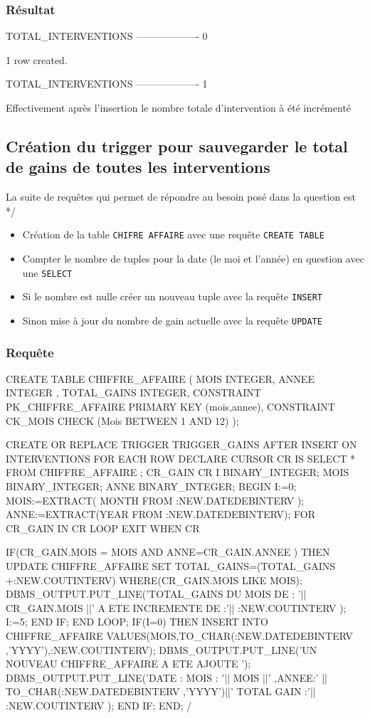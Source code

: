 \documentclass[•]{article}
\begin{document}
\subsubsection{Résultat}
\begin{sql}
TOTAL_INTERVENTIONS
-------------------
                  0

1 row created.

TOTAL_INTERVENTIONS
-------------------
                  1
\end{sql}

Effectivement après l'insertion le nombre totale d'intervention à été incrémenté

\subsection{Création du trigger pour sauvegarder le total de gains de
toutes les interventions}

La suite de requêtes qui permet de répondre au besoin posé dans la question est */

\begin{itemize}
\item Création de la table \texttt{CHIFRE\ AFFAIRE} avec une requête \texttt{CREATE\ TABLE} 
\item Compter le nombre de tuples pour la date (le moi et l'année) en question avec une  \texttt{SELECT}
\item Si le nombre est nulle créer un nouveau tuple avec la requête \texttt{INSERT}
\item Sinon mise à jour du nombre de gain actuelle avec la requête \texttt{UPDATE}
\end{itemize}


\subsubsection{Requête}
\begin{sql}
CREATE TABLE CHIFFRE_AFFAIRE
(
	 MOIS INTEGER, 
	 ANNEE INTEGER ,
	 TOTAL_GAINS INTEGER,
CONSTRAINT PK_CHIFFRE_AFFAIRE PRIMARY KEY (mois,annee),
CONSTRAINT CK_MOIS CHECK (Mois BETWEEN 1 AND 12)
);

CREATE OR REPLACE TRIGGER TRIGGER_GAINS 
AFTER INSERT  ON INTERVENTIONS 
FOR EACH ROW
DECLARE 
CURSOR CR IS SELECT * FROM CHIFFRE_AFFAIRE ;
CR_GAIN CR%
I BINARY_INTEGER;
MOIS BINARY_INTEGER;
ANNE BINARY_INTEGER;
BEGIN
I:=0;
MOIS:=EXTRACT( MONTH FROM :NEW.DATEDEBINTERV );
ANNE:=EXTRACT(YEAR FROM :NEW.DATEDEBINTERV);
  FOR CR_GAIN IN CR LOOP
  EXIT WHEN  CR%
  
  IF(CR_GAIN.MOIS = MOIS AND ANNE=CR_GAIN.ANNEE ) THEN
  UPDATE CHIFFRE_AFFAIRE SET TOTAL_GAINS=(TOTAL_GAINS +:NEW.COUTINTERV)  WHERE(CR_GAIN.MOIS LIKE MOIS);
  DBMS_OUTPUT.PUT_LINE('TOTAL_GAINS DU MOIS DE : '|| CR_GAIN.MOIS ||' A ETE INCREMENTE DE :'|| :NEW.COUTINTERV ); I:=5;
  END IF;
  END LOOP;
  IF(I=0) THEN
  INSERT INTO CHIFFRE_AFFAIRE VALUES(MOIS,TO_CHAR(:NEW.DATEDEBINTERV ,'YYYY'),:NEW.COUTINTERV);
  DBMS_OUTPUT.PUT_LINE('UN NOUVEAU CHIFFRE_AFFAIRE A ETE AJOUTE ');
  DBMS_OUTPUT.PUT_LINE('DATE : MOIS : '|| MOIS ||' ,ANNEE:' || TO_CHAR(:NEW.DATEDEBINTERV ,'YYYY')||' TOTAL GAIN :'|| :NEW.COUTINTERV );
END IF;
END;
/
\end{sql}
\end{document}
